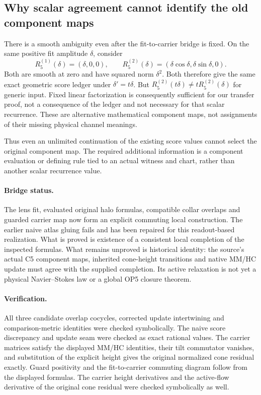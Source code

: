 \documentclass[11pt,a4paper]{article}
\begin{document}
\subsection{Why scalar agreement cannot identify the old component maps}
There is a smooth ambiguity even after the fit-to-carrier bridge is
fixed. On the same positive fit amplitude $\delta$, consider
\[
 R_5^{(1)}(\delta)=(\delta,0,0),\qquad
 R_5^{(2)}(\delta)=(\delta\cos\delta,\delta\sin\delta,0).
\]
Both are smooth at zero and have squared norm $\delta^2$. Both therefore
give the same exact geometric score ledger under $\delta'=t\delta$.
But $R_5^{(2)}(t\delta)\ne tR_5^{(2)}(\delta)$ for generic input.
Fixed linear factorization is consequently sufficient for our transfer
proof, not a consequence of the ledger and not necessary for that
scalar recurrence. These are alternative mathematical component maps,
not assignments of their missing physical channel meanings.

Thus even an unlimited continuation of the existing score values cannot
select the original component map. The required additional information
is a component evaluation or defining rule tied to an actual witness
and chart, rather than another scalar recurrence value.

\paragraph{Bridge status.}
The lens fit, evaluated original halo formulas, compatible collar
overlaps and guarded carrier map now form an explicit commuting local
construction. The earlier naive atlas gluing fails and has been repaired
for this readout-based realization. What is proved is existence of a
consistent local completion of the inspected formulas. What remains
unproved is historical identity: the source's actual C5 component maps,
inherited cone-height transitions and native MM/HC update must agree
with the supplied completion. Its active relaxation is not yet a
physical Navier--Stokes law or a global OP5 closure theorem.

\paragraph{Verification.}
All three candidate overlap cocycles, corrected update intertwining and
comparison-metric identities were checked symbolically. The naive
score discrepancy and update seam were checked as exact rational values.
The carrier matrices satisfy the displayed MM/HC identities, their tilt
commutator vanishes, and substitution of the explicit height gives the
original normalized cone residual exactly. Guard positivity and the
fit-to-carrier commuting diagram follow from the displayed formulas.
The carrier height derivatives and the active-flow derivative of the
original cone residual were checked symbolically as well.
\end{document}

